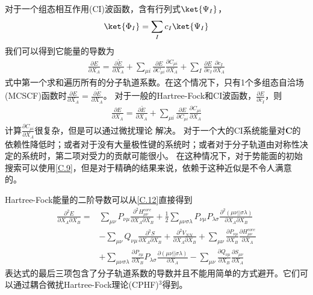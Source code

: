 对于一个组态相互作用(CI)波函数，含有行列式$\ket{\Psi _I}$，
\begin{align}
	\nonumber
    \ket{\Phi  _I}=\sum_{I}c_I\ket{\Psi _I}
\end{align}
我们可以得到它能量的导数为
\begin{align}
	\label{C.16}
	\frac{\partial E}{\partial X_A}=\frac{\partial {\tilde{E} }}{\partial X_A}
	+\sum_{\mu i}\frac{\partial E}{\partial C_{\mu i}}\frac{\partial C_{\mu i}}{\partial X_A}
	+\sum_{I}\frac{\partial E}{\partial c_{I}}\frac{\partial c_{I}}{\partial X_A}
\end{align}
式中第一个求和遍历所有的分子轨道系数。在这个情况下，只有1个多组态自洽场(MCSCF)函数时$\frac{\partial E}{\partial X_A}=\frac{\partial {\tilde{E} }}{\partial X_A}$。
对于一般的Hartree-Fock和CI波函数，$\frac{\partial E}{\partial c_{I}}$，则
\begin{align}
	\label{C.17}
	\frac{\partial E}{\partial X_A}=\frac{\partial {\tilde{E} }}{\partial X_A}
	+\sum_{\mu i}\frac{\partial E}{\partial C_{\mu i}}\frac{\partial C_{\mu i}}{\partial X_A}
\end{align}
计算$\frac{\partial C_{\mu i}}{\partial X_A}$很复杂，但是可以通过微扰理论
解决。
对于一个大的CI系统能量对$\mathbf{C}$的依赖性降低时；或者对于没有大量极性键的系统时；或者对于分子轨道由对称性决定的系统时，第二项对受力的贡献可能很小。
在这种情况下，对于势能面的初始搜索可以使用\autoref{C.9}，但是对于精确的结果来说，依赖于这种近似是不令人满意的。

Hartree-Fock能量的二阶导数可以从\autoref{C.12}直接得到
\begin{align}
	\nonumber
	\frac{\partial^2 E}{\partial X_A\partial X_B}=&\sum_{ \mu \nu }P_{\nu \mu}\frac{\partial^2 H_{\mu \nu}^{core}}{\partial X_A\partial X_B}
		+\frac{1}{2}\sum_{\mu \nu \sigma \lambda }P_{ \nu \mu }P_{\lambda \sigma}\frac{\partial^2 (\mu \nu|| \sigma\lambda)}{\partial X_A\partial X_B}
		\\ \nonumber &
		-\sum_{\mu \nu }Q_{ \nu \mu}\frac{\partial^2 S}{\partial X_A\partial X_B}
		+\frac{\partial^2 V_{NN}}{\partial X_A\partial X_B}
		+\sum_{\mu \nu }\frac{\partial P_{ \nu\mu}}{\partial X_B}\frac{\partial H_{\mu \nu}^{core}}{\partial X_A}
		\\ \nonumber &
		+\sum_{\mu \nu \sigma \lambda }\frac{\partial P_{ \nu \mu }}{\partial X_B}P_{\lambda \sigma}\frac{\partial (\mu \nu|| \sigma\lambda)}{\partial X_A}
		-\sum_{\mu \nu }\frac{\partial Q_{ \nu\mu}}{\partial X_B}\frac{\partial S_{\mu \nu}}{\partial X_A}
	\end{align}
表达式的最后三项包含了分子轨道系数的导数并且不能用简单的方式避开。它们可以通过耦合微扰Hartree-Fock理论(CPHF)$^3$得到。
